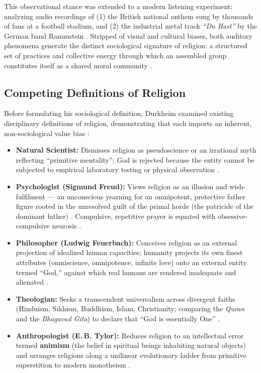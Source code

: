 This observational stance was extended to a modern listening experiment: analyzing audio recordings of (1) the British national anthem sung by thousands of fans at a football stadium, and (2) the industrial metal track \textit{``Du Hast''} by the German band Rammstein . Stripped of visual and cultural biases, both auditory phenomena generate the distinct sociological signature of religion: a structured set of practices and collective energy through which an assembled group constitutes itself as a shared moral community .

\subsection{Competing Definitions of Religion}

Before formulating his sociological definition, Durkheim examined existing disciplinary definitions of religion, demonstrating that each imports an inherent, non-sociological value bias :
\begin{itemize}
    \item \textbf{Natural Scientist:} Dismisses religion as pseudoscience or an irrational myth reflecting ``primitive mentality''; God is rejected because the entity cannot be subjected to empirical laboratory testing or physical observation .
    \item \textbf{Psychologist (Sigmund Freud):} Views religion as an illusion and wish-fulfilment --- an unconscious yearning for an omnipotent, protective father figure rooted in the unresolved guilt of the primal horde (the patricide of the dominant father) . Compulsive, repetitive prayer is equated with obsessive-compulsive neurosis .
    \item \textbf{Philosopher (Ludwig Feuerbach):} Conceives religion as an external projection of idealized human capacities; humanity projects its own finest attributes (omniscience, omnipotence, infinite love) onto an external entity termed ``God,'' against which real humans are rendered inadequate and alienated .
    \item \textbf{Theologian:} Seeks a transcendent universalism across divergent faiths (Hinduism, Sikhism, Buddhism, Islam, Christianity; comparing the \textit{Quran} and the \textit{Bhagavad Gita}) to declare that ``God is essentially One'' .
    \item \textbf{Anthropologist (E.\,B. Tylor):} Reduces religion to an intellectual error termed \textbf{animism} (the belief in spiritual beings inhabiting natural objects) and arranges religions along a unilinear evolutionary ladder from primitive superstition to modern monotheism .
\end{itemize}

